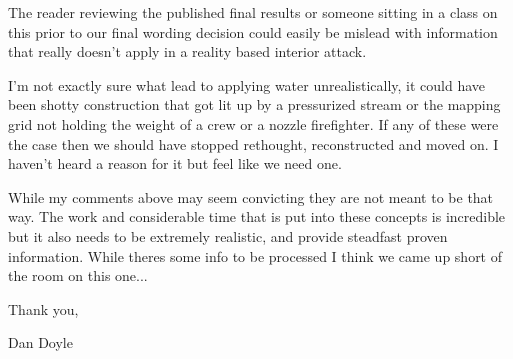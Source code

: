 \documentclass[12pt,oneside]{book}
\begin{document}
\begin{appendix}
The reader reviewing the published final results or someone sitting in a class on this prior to our final wording decision could easily be mislead with information that really doesn't apply in a reality based interior attack.  
 
I'm not exactly sure what lead to applying water unrealistically, it could have been shotty construction that got lit up by a pressurized stream or the mapping grid not holding the weight of a crew or a nozzle firefighter.  If any of these were the case then we should have stopped rethought, reconstructed and moved on.  I haven't heard a reason for it but feel like we need one.  
 
While my comments above may seem convicting they are not meant to be that way.  The work and considerable time that is put into these concepts is incredible but it also needs to be extremely realistic, and provide steadfast proven information.  While theres some info to be processed I think we came up short of the room on this one...
 
Thank you,
 
Dan Doyle

\end{appendix}
\end{document}
